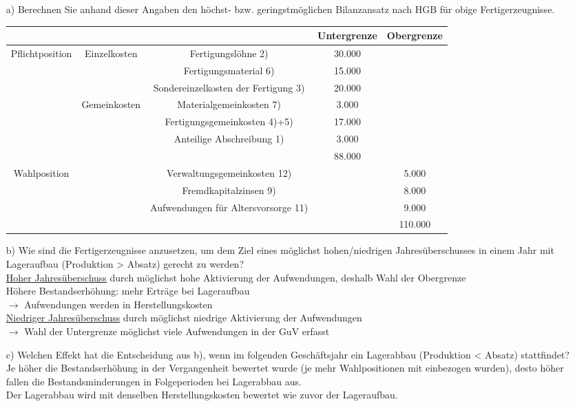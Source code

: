 \documentclass[paper=a4, fontsize=11pt]{scrartcl}
\numberwithin{equation}{section}
\numberwithin{figure}{section}
\numberwithin{table}{section}
\begin{document}
\begin{itemize}
\item[a)] Berechnen Sie anhand dieser Angaben den höchst- bzw. geringstmöglichen Bilanzansatz nach HGB für obige Fertigerzeugnisse. \\

\begin{tabular}{|c|cc|c|c|}
\hline
 & & & Untergrenze & Obergrenze \\\hline
Pflichtposition & Einzelkosten & Fertigungslöhne 2) & 30.000 & \\
 & & Fertigungsmaterial 6) & 15.000 & \\
 & & Sondereinzelkosten der Fertigung 3) & 20.000 & \\
 & Gemeinkosten & Materialgemeinkosten 7) & 3.000 & \\
 & & Fertigungsgemeinkosten 4)+5) & 17.000 & \\
 & & Anteilige Abschreibung 1) & 3.000 & \\\hline
 & & & 88.000 & \\\hline
Wahlposition & & Verwaltungsgemeinkosten 12) & & 5.000 \\
 & & Fremdkapitalzinsen 9) & & 8.000 \\
 & & Aufwendungen für Altersvorsorge 11) & & 9.000 \\\hline
 & & & & 110.000 \\\hline 
\end{tabular}
\item[b)] Wie sind die Fertigerzeugnisse anzusetzen, um dem Ziel eines möglichst hohen/niedrigen Jahresüberschusses in einem Jahr mit Lageraufbau (Produktion > Absatz) gerecht zu werden? \\

\underline{Hoher Jahresüberschuss} durch möglichst hohe Aktivierung der Aufwendungen, deshalb Wahl der Obergrenze \\
Höhere Bestandserhöhung: mehr Erträge bei Lageraufbau \\
$\rightarrow$ Aufwendungen werden in Herstellungskosten \\

\underline{Niedriger Jahresüberschuss} durch möglichst niedrige Aktivierung der Aufwendungen \\
$\rightarrow$ Wahl der Untergrenze möglichst viele Aufwendungen in der GuV erfasst
\item[c)] Welchen Effekt hat die Entscheidung aus b), wenn im folgenden Geschäftsjahr ein Lagerabbau (Produktion < Absatz) stattfindet? \\

Je höher die Bestandserhöhung in der Vergangenheit bewertet wurde (je mehr Wahlpositionen mit einbezogen wurden), desto höher fallen die Bestandsminderungen in Folgeperioden bei Lagerabbau aus. \\
Der Lagerabbau wird mit denselben Herstellungskosten bewertet wie zuvor der Lageraufbau.
\end{itemize}
\end{document}
